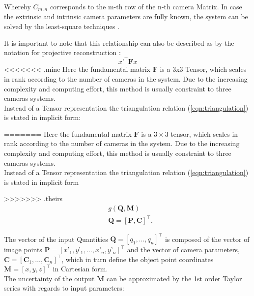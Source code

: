 \documentclass[5p,times,procedia]{elsarticle}
\begin{document}
Whereby $C_{m,n}$ corresponds to the m-th row of the n-th camera Matrix.
In case the extrinsic and intrinsic camera parameters are fully known, the system can be solved by the least-square techniques \cite{Ahn2004}.

It is important to note that this relationship can also be described as by the notation for projective reconstruction \cite{Hartley2018}:
\begin{equation}
	\label{eqn:ProjectiveReconstruction}
	x’^{\top}\mathbf{F}x
\end{equation}
<<<<<<< .mine
Here the fundamental matrix $\mathbf{F}$ is a 3x3 Tensor, which scales in rank according to the number of cameras in the system. Due to the increasing complexity and computing effort, this method is usually constraint to three cameras systems.\\
Instead of a Tensor representation the triangulation relation (\ref{eqn:triangulation}) is stated in implicit form:

=======
Here the fundamental matrix $\mathbf{F}$ is a $3\times 3$ tensor, which scales in rank according to the number of cameras in the system. Due to the increasing complexity and computing effort, this method is usually constraint to three cameras systems.\\
Instead of a Tensor representation the triangulation relation (\ref{eqn:triangulation}) is stated in implicit form

>>>>>>> .theirs
\begin{equation}
	\label{eqn:ImplicitFrom}
	\begin{aligned}
		& g(\mathbf{Q},\mathbf{M}) \\
		& \mathbf{Q} = [\mathbf{P},\mathbf{C}]^{\top}.
	\end{aligned}
\end{equation}

The vector of the input Quantities $\mathbf{Q} = \left[q_1,\dots, q_{n}\right]^{\top}$ is composed of the vector of image points $\mathbf{P} = [x’_1,y’_1, \dots ,x’_n,y’_n]^{\top}$ and the vector of camera parameters, $\mathbf{C} = \left[ \mathbf{C}_1 , \dots , \mathbf{C}_n \right]^{\top}$, which in turn define the object point coordinates $\mathbf{M} =  [x,y,z]^{\top}$ in Cartesian form. \\
The uncertainty of the output $\mathbf{M}$ can be approximated by the 1st order Taylor series with regards to input parameters:
\end{document}
